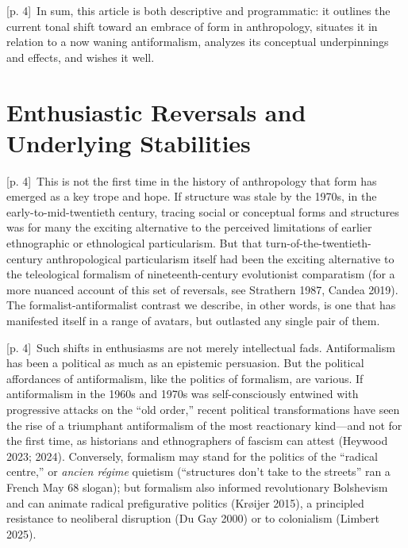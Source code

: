 \documentclass[10pt,a4paper]{article}
\begin{document}
{\scriptsize\color{gray} [p. 4]}\ In sum, this article is both descriptive and programmatic: it outlines the current tonal shift toward an embrace of form in anthropology, situates it in relation to a now waning antiformalism, analyzes its conceptual underpinnings and effects, and wishes it well.\par
{}\section*{Enthusiastic Reversals and Underlying Stabilities}
{\scriptsize\color{gray} [p. 4]}\ This is not the first time in the history of anthropology that form has emerged as a key trope and hope. If structure was stale by the 1970s, in the early-to-mid-twentieth century, tracing social or conceptual forms and structures was for many the exciting alternative to the perceived limitations of earlier ethnographic or ethnological particularism. But that turn-of-the-twentieth-century anthropological particularism itself had been the exciting alternative to the teleological formalism of nineteenth-century evolutionist comparatism (for a more nuanced account of this set of reversals, see Strathern 1987, Candea 2019). The formalist-antiformalist contrast we describe, in other words, is one that has manifested itself in a range of avatars, but outlasted any single pair of them.\par
{\scriptsize\color{gray} [p. 4]}\ Such shifts in enthusiasms are not merely intellectual fads. Antiformalism has been a political as much as an epistemic persuasion. But the political affordances of antiformalism, like the politics of formalism, are various. If antiformalism in the 1960s and 1970s was self-consciously entwined with progressive attacks on the “old order,” recent political transformations have seen the rise of a triumphant antiformalism of the most reactionary kind—and not for the first time, as historians and ethnographers of fascism can attest (Heywood 2023; 2024). Conversely, formalism may stand for the politics of the “radical centre,” or \textit{ancien régime} quietism (“structures don’t take to the streets” ran a French May 68 slogan); but formalism also informed revolutionary Bolshevism and can animate radical prefigurative politics (Krøijer 2015), a principled resistance to neoliberal disruption (Du Gay 2000) or to colonialism (Limbert 2025).\par
\end{document}
